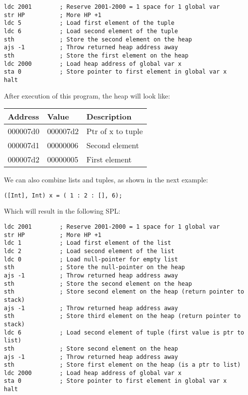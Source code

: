 \documentclass[a4paper]{article}
\begin{document}
\begin{lstlisting}
ldc 2001        ; Reserve 2001-2000 = 1 space for 1 global var
str HP          ; More HP +1
ldc 5           ; Load first element of the tuple
ldc 6           ; Load second element of the tuple
sth             ; Store the second element on the heap
ajs -1          ; Throw returned heap address away
sth             ; Store the first element on the heap
ldc 2000        ; Load heap address of global var x
sta 0           ; Store pointer to first element in global var x
halt
\end{lstlisting}
After execution of this program, the heap will look like:

\begin{tabular}{|l|l|l|}
        \hline
        Address & Value & Description \\
        \hline
        000007d0 & 000007d2 & Ptr of x to tuple \\
        000007d1 & 00000006 & Second element  \\
        000007d2 & 00000005 & First element  \\
        \hline
\end{tabular}

We can also combine lists and tuples, as shown in the next example: 
\begin{lstlisting}
([Int], Int) x = ( 1 : 2 : [], 6);
\end{lstlisting}

Which will result in the following SPL:
\begin{lstlisting}
ldc 2001        ; Reserve 2001-2000 = 1 space for 1 global var
str HP          ; More HP +1
ldc 1           ; Load first element of the list
ldc 2           ; Load second element of the list
ldc 0           ; Load null-pointer for empty list
sth             ; Store the null-pointer on the heap
ajs -1          ; Throw returned heap address away
sth             ; Store the second element on the heap
sth             ; Store second element on the heap (return pointer to stack)
ajs -1          ; Throw returned heap address away
sth             ; Store third element on the heap (return pointer to stack)
ldc 6           ; Load second element of tuple (first value is ptr to list)
sth             ; Store second element on the heap
ajs -1          ; Throw returned heap address away
sth             ; Store first element on the heap (is a ptr to list)
ldc 2000        ; Load heap address of global var x
sta 0           ; Store pointer to first element in global var x
halt
\end{lstlisting}
\end{document}
